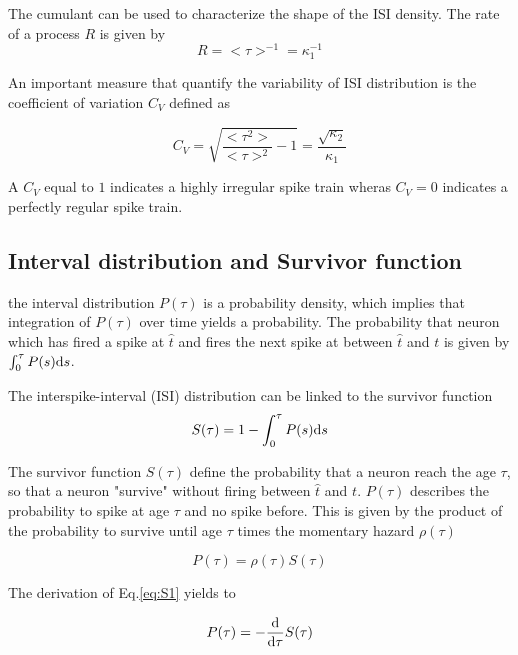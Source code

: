 \documentclass[a4paper,11pt,twoside]{article}
\def \dd  {{\rm d}}
\numberwithin{equation}{section}
\begin{document}
The cumulant can be used to characterize the shape of the ISI density. The rate of a process $R$ is given by
\begin{equation}
\label{eq:R}
R=<\tau>^{-1}=\kappa_1^{-1}
\end{equation}


An important measure that quantify the variability of ISI distribution is the coefficient of variation $C_V$ defined as


\begin{equation}
\label{eq:CV}
C_V=\sqrt{\frac{<\tau^2>}{<\tau>^2}-1}=\frac{\sqrt{\kappa_2}}{\kappa_1}
\end{equation}

A $C_V$ equal to $1$ indicates a highly irregular spike train wheras  $C_V=0$ indicates a perfectly regular spike train.


\subsection{Interval distribution and Survivor function}
the interval distribution $P(\tau)$ is a probability density, which implies that integration of $P(\tau)$ over time yields a probability. The probability that neuron which has fired a spike at $\hat{t}$ and fires the next spike at between $\hat{t}$ and $t$ is given by $\int_0^\tau P(s) \dd s$.

The interspike-interval (ISI) distribution can be linked to the survivor function
\begin{equation}
\label{eq:S1}
S(\tau)=1-\int_0^\tau P(s) \dd s
\end{equation}


The survivor function $S(\tau)$ define the probability that a neuron reach the age $\tau$, so that a neuron "survive" without firing between $\hat{t}$ and $t$. $P(\tau)$ describes the probability to spike at age $\tau$ and no spike before. This is given by the product of the probability to survive until age $\tau$ times the momentary hazard $\rho(\tau)$

\begin{equation}
\label{eq:P2}
P(\tau)=\rho(\tau)S(\tau)
\end{equation}

The derivation of Eq.\eqref{eq:S1} yields to 

\begin{equation}
\label{eq:P3}
P(\tau)=-\frac{\dd}{\dd \tau}S(\tau)
\end{equation}
\end{document}
